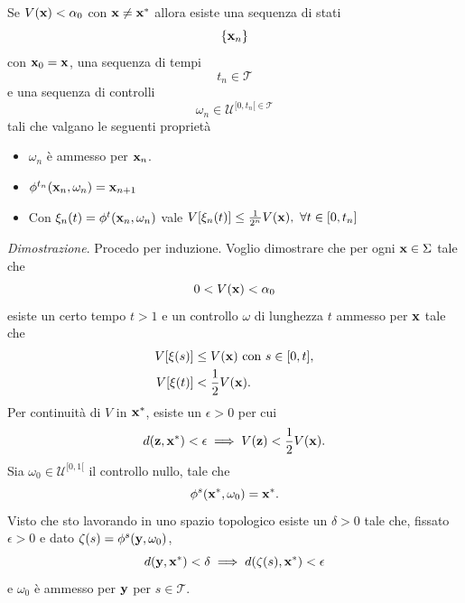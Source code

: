 \begin{steps}
    \begin{aff}
        Se $V(\mathbf{x}) < \alpha_0$ con $\mathbf{x} \neq \mathbf{x}^*$ allora esiste
        una sequenza di stati
        \begin{equation*}
        \{\mathbf{x}_n\}
        \end{equation*}
        con $\mathbf{x}_0 = \mathbf{x}$, una sequenza di tempi
        \begin{equation*}
        t_n \in \mathcal T
        \end{equation*}
        e una sequenza di controlli
        \begin{equation*}
            \omega_n \in \mathcal U^{[0, t_n[ \in \mathcal T}
        \end{equation*}
        tali che valgano le seguenti proprietà
        \begin{itemize}
            \item $\omega_n$ è ammesso per $\mathbf{x}_n$.
            \item $\phi^{t_n}(\mathbf{x}_n, \omega_n) = \mathbf{x}_{n+1}$
            \item Con $\xi_n(t) = \phi^t(\mathbf{x}_n, \omega_n)$ vale $V[\xi_n(t)] \leq \frac 1 {2^n} V(\mathbf{x}), \ \forall t \in [0, t_n]$
        \end{itemize}
    \end{aff}
    \emph{Dimostrazione}.
    Procedo per induzione.
    Voglio dimostrare che  per ogni $\mathbf{x} \in \Sigma$ tale che
    \begin{equation*}
        0 < V(\mathbf{x}) < \alpha_0
    \end{equation*}
    esiste un certo tempo $t > 1$ e un controllo $\omega$
    di lunghezza $t$ ammesso per $\mathbf{x}$ tale che
    \begin{align*}
        V[\xi(s)] &\leq V(\mathbf{x}) \text{ con } s \in [0, t], \\
        V[\xi(t)] &< \frac 1 2 V(\mathbf{x}).
    \end{align*}
    Per continuità di $V$ in $\mathbf{x}^*$, esiste un $\epsilon > 0$ per cui
    \begin{equation}
        d(\mathbf{z}, \mathbf{x}^*) < \epsilon \implies V(\mathbf{z}) < \frac 1 2 V(\mathbf{x}).
        \label{eq:dzxstar}
    \end{equation}
    Sia $\omega_0 \in \mathcal U^{[0, 1[}$ il controllo nullo,
    tale che
    \begin{equation*}
        \phi^s(\mathbf{x}^*, \omega_0) = \mathbf{x}^*.
    \end{equation*}
    Visto che sto lavorando in uno spazio topologico
    esiste un $\delta > 0$ tale che, fissato $\epsilon > 0$ e
    dato $\zeta(s) = \phi^s(\mathbf{y}, \omega_0)$,
    \begin{equation*}
        d(\mathbf{y}, \mathbf{x}^*) < \delta \implies d(\zeta(s), \mathbf{x}^*) < \epsilon
    \end{equation*}
    e $\omega_0$ è ammesso per $\mathbf{y}$ per $s \in \mathcal T$.


\end{steps}
